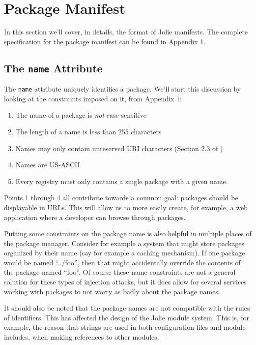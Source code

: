 \section{Package Manifest}
\label{sec:manifest}

In this section we'll cover, in details, the format of Jolie manifests. The
complete specification for the package manifest can be found in Appendix 1.

\subsection{The {\tt name} Attribute}

The \texttt{name} attribute uniquely identifies a package. We'll
start this discussion by looking at the constraints imposed on it, from
Appendix 1:

\begin{enumerate}
\item
    The name of a package is \emph{not} case-sensitive
\item
    The length of a name is less than 255 characters
\item
    Names may only contain unreserved URI characters (Section 2.3 of
            \autocite{rfc3986})
\item
    Names are US-ASCII
\item
    Every registry must only contains a single package with a given name.
\end{enumerate}

Points 1 through 4 all contribute towards a common goal: packages should be
displayable in URLs. This will allow us to more easily create, for example,
a web application where a developer can browse through packages.

Putting some constraints on the package name is also helpful in multiple places
of the package manager. Consider for example a system that might store packages
organized by their name (say for example a caching mechanism). If one package
would be named ``../foo'', then that might accidentally override the contents
of the package named ``foo''. Of course these name constraints are not a
general solution for these types of injection attacks, but it does allow for
several services working with packages to not worry as badly about the package
names.

It should also be noted that the package names are not compatible with the
rules of identifiers. This has affected the design of the Jolie module system.
This is, for example, the reason that strings are used in both configuration
files and module includes, when making references to other modules.

